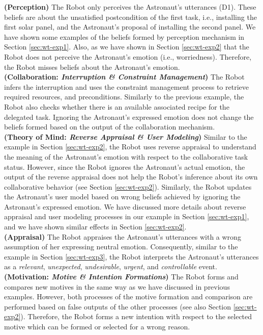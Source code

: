 \noindent\textbf{(Perception)} The Robot only perceives the Astronaut's
utterances (D1). These beliefs are about the unsatisfied postcondition of the
first task, i.e., installing the first solar panel, and the Astronaut's proposal
of installing the second panel. We have shown some examples of the beliefs
formed by perception mechanism in Section \ref{sec:wt-exp1}. Also, as we have
shown in Section \ref{sec:wt-exp2} that the Robot does not perceive the
Astronaut's emotion (i.e., worriedness). Therefore, the Robot misses beliefs
about the Astronaut's emotion.\\

\noindent\textbf{(Collaboration: \textit{Interruption \& Constraint
Management})} The Robot infers the interruption and uses the constraint
management process to retrieve required resources, and preconditions. Similarly
to the previous example, the Robot also checks whether there is an available
associated recipe for the delegated task. Ignoring the Astronaut's expressed
emotion does not change the beliefs formed based on the output of the
collaboration mechanism.\\

\noindent\textbf{(Theory of Mind: \textit{Reverse Appraisal \& User Modeling})}
Similar to the example in Section \ref{sec:wt-exp2}, the Robot uses reverse
appraisal to understand the meaning of the Astronaut's emotion with respect to
the collaborative task status. However, since the Robot ignores the Astronaut's
actual emotion, the output of the reverse appraisal does not help the Robot's
inference about its own collaborative behavior (see Section \ref{sec:wt-exp2}).
Similarly, the Robot updates the Astronaut's user model based on wrong beliefs
achieved by ignoring the Astronaut's expressed emotion. We have discussed more
details about reverse appraisal and user modeling processes in our example in
Section \ref{sec:wt-exp1}, and we have shown similar effects in Section
\ref{sec:wt-exp2}.\\

\noindent\textbf{(Appraisal)} The Robot appraises the Astronaut's utterances
with a wrong assumption of her expressing neutral emotion. Consequently, similar
to the example in Section \ref{sec:wt-exp3}, the Robot interprets the
Astronaut's utterances as a \textit{relevant}, \textit{unexpected},
\textit{undesirable}, \textit{urgent}, and \textit{controllable} event.\\

\noindent\textbf{(Motivation: \textit{Motive \& Intention Formations})} The
Robot forms and compares new motives in the same way as we have discussed in
previous examples. However, both processes of the motive formation and
comparison are performed based on false outputs of the other processes (see also
Section \ref{sec:wt-exp2}). Therefore, the Robot forms a new intention with
respect to the selected motive which can be formed or selected for a wrong
reason.\\

